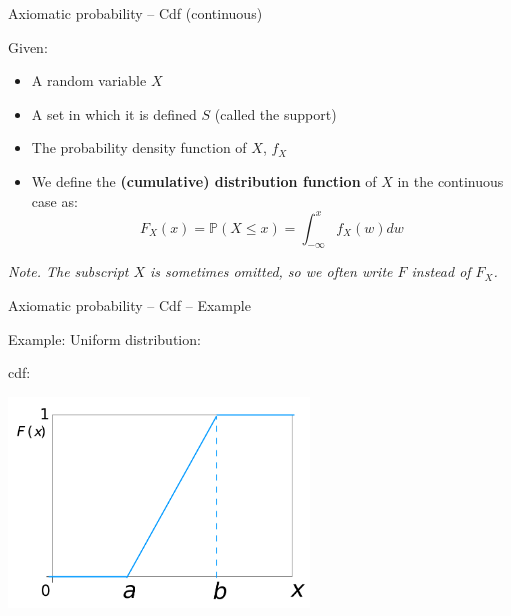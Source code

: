 \documentclass{beamer}
\begin{document}
\begin{frame}
{\centerline{Axiomatic probability -- Cdf (continuous)}}
Given:
\begin{itemize}
\item A random variable $X$
\item A set in which it is defined $S$ (called the support)
\item The probability density function of $X$, $f_X$
\item We define the \textbf{(cumulative) distribution function} of $X$ in the continuous case as:
$$F_X(x) = \mathbb{P}(X \leq x) =  \int_{-\infty}^{x} f_X(w)dw $$

\end{itemize}

\vspace*{1cm}
\textit{Note. The subscript $X$ is sometimes omitted, so we often write $F$ instead of $F_X$.}
\end{frame}




\begin{frame}
{\centerline{Axiomatic probability -- Cdf -- Example}}
Example: Uniform distribution:

cdf:
\begin{center}
\includegraphics[width=8cm]{A2022.FondamentiStatistica/Uniform_cdf_svg.png}
\end{center}

\end{frame}

\end{document}
